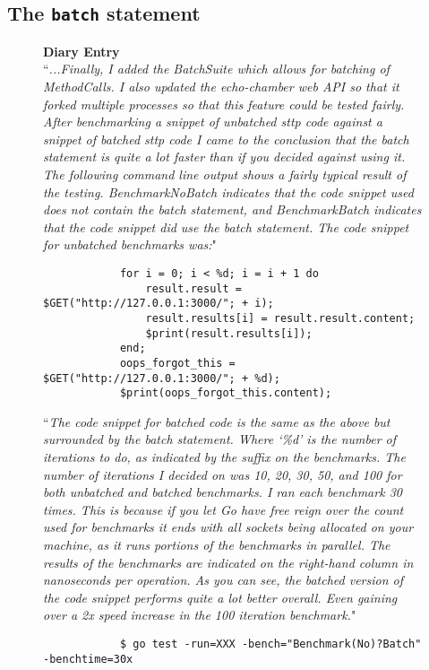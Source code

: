 \cprotect\subsection{The \verb|batch| statement}
\label{sec:eval-ast-nodes-batch}

\begin{figure}[H]
    \begin{center}
        \textbf{Diary Entry}\\[0.5em]
        ``\textit{...Finally, I added the BatchSuite which allows for batching of MethodCalls. I also updated the echo-chamber web API so that it forked multiple processes so that this feature could be tested fairly. After benchmarking a snippet of unbatched sttp code against a snippet of batched sttp code I came to the conclusion that the batch statement is quite a lot faster than if you decided against using it. The following command line output shows a fairly typical result of the testing. BenchmarkNoBatch indicates that the code snippet used does not contain the batch statement, and BenchmarkBatch indicates that the code snippet did use the batch statement. The code snippet for unbatched benchmarks was:}"
        \begin{verbatim}
            for i = 0; i < %d; i = i + 1 do
                result.result = $GET("http://127.0.0.1:3000/"; + i);
                result.results[i] = result.result.content;
                $print(result.results[i]);
            end;
            oops_forgot_this = $GET("http://127.0.0.1:3000/"; + %d);
            $print(oops_forgot_this.content);
        \end{verbatim}
        ``\textit{The code snippet for batched code is the same as the above but surrounded by the batch statement. Where `\%d' is the number of iterations to do, as indicated by the suffix on the benchmarks. The number of iterations I decided on was 10, 20, 30, 50, and 100 for both unbatched and batched benchmarks. I ran each benchmark 30 times. This is because if you let Go have free reign over the count used for benchmarks it ends with all sockets being allocated on your machine, as it runs portions of the benchmarks in parallel. The results of the benchmarks are indicated on the right-hand column in nanoseconds per operation. As you can see, the batched version of the code snippet performs quite a lot better overall. Even gaining over a 2x speed increase in the 100 iteration benchmark.}"
        \begin{verbatim}    
            $ go test -run=XXX -bench="Benchmark(No)?Batch" -benchtime=30x

\end{verbatim}
\end{center}
\end{figure}

